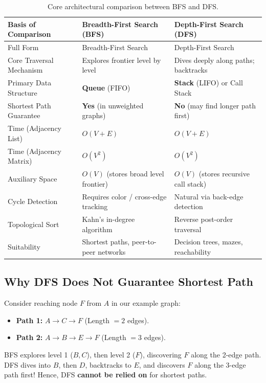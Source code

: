 \begin{table}[htbp]
\centering
\small
\begin{tabularx}{\textwidth}{p{3.5cm} X X}
\toprule
\textbf{Basis of Comparison} & \textbf{Breadth-First Search (BFS)} & \textbf{Depth-First Search (DFS)} \\
\midrule
Full Form & Breadth-First Search & Depth-First Search \\
Core Traversal Mechanism & Explores frontier level by level & Dives deeply along paths; backtracks \\
Primary Data Structure & \textbf{Queue} (FIFO) & \textbf{Stack} (LIFO) or Call Stack \\
Shortest Path Guarantee & \textbf{Yes} (in unweighted graphs) & \textbf{No} (may find longer path first) \\
Time (Adjacency List) & $\boxed{O(V + E)}$ & $\boxed{O(V + E)}$ \\
Time (Adjacency Matrix) & $O(V^2)$ & $O(V^2)$ \\
Auxiliary Space & $O(V)$ (stores broad level frontier) & $O(V)$ (stores recursive call stack) \\
Cycle Detection & Requires color / cross-edge tracking & Natural via back-edge detection \\
Topological Sort & Kahn's in-degree algorithm & Reverse post-order traversal \\
Suitability & Shortest paths, peer-to-peer networks & Decision trees, mazes, reachability \\
\bottomrule
\end{tabularx}
\caption{Core architectural comparison between BFS and DFS.}
\end{table}

\subsection{Why DFS Does Not Guarantee Shortest Path}
Consider reaching node $F$ from $A$ in our example graph:
\begin{itemize}
    \item \textbf{Path 1:} $A \to C \to F$ (Length $= 2$ edges).
    \item \textbf{Path 2:} $A \to B \to E \to F$ (Length $= 3$ edges).
\end{itemize}
BFS explores level 1 ($B, C$), then level 2 ($F$), discovering $F$ along the 2-edge path. DFS dives into $B$, then $D$, backtracks to $E$, and discovers $F$ along the 3-edge path first! Hence, DFS \textbf{cannot be relied on} for shortest paths.

